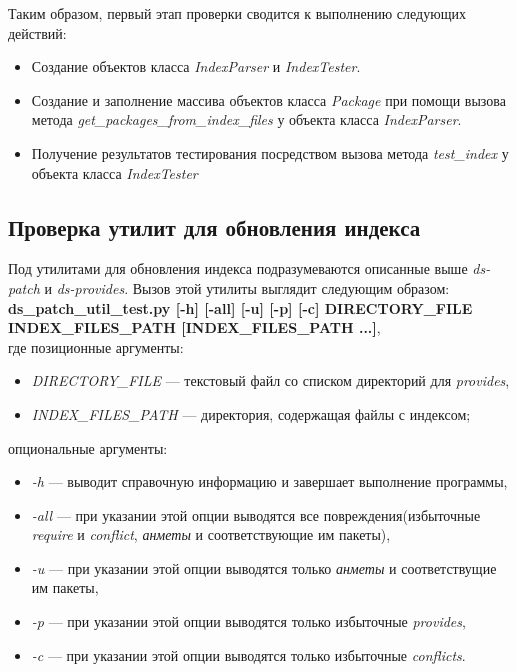 Таким образом, первый этап проверки сводится к выполнению следующих действий:
\begin{itemize}
\item{Создание объектов класса \textit{IndexParser} и \textit{IndexTester}.}
\item{Создание и заполнение массива объектов класса \textit{Package} при помощи
вызова метода \textit{get\_packages\_from\_index\_files} у объекта класса \textit{IndexParser}.}
\item{Получение результатов тестирования посредством вызова метода \textit{test\_index}
у объекта класса \textit{IndexTester}}
\end{itemize}



\subsection{Проверка утилит для обновления индекса}
Под утилитами для обновления индекса подразумеваются описанные
выше \textit{ds-patch} и \textit{ds-provides}.
Вызов этой утилиты выглядит следующим образом:\\
\textbf{ds\_patch\_util\_test.py [-h] [-all] [-u] [-p] [-c] DIRECTORY\_FILE INDEX\_FILES\_PATH [INDEX\_FILES\_PATH ...]},\\
 где
позиционные аргументы:\\
\begin{itemize}
\item{\emph{DIRECTORY\_FILE} --- текстовый файл со списком директорий для \textit{provides},}
\item{\emph{INDEX\_FILES\_PATH} --- директория, содержащая файлы с индексом;}
\end{itemize}
опциональные аргументы:\\
\begin{itemize}
\item{\emph{-h} --- выводит справочную информацию и завершает выполнение программы,}
\item{\emph{-all} --- при указании этой опции выводятся все повреждения(избыточные \textit{require} и \textit{conflict}, \textit{анметы} и
соответствующие им пакеты),}
\item{\emph{-u} --- при указании этой опции выводятся только \textit{анметы} и соответствущие им пакеты,}
\item{\emph{-p} --- при указании этой опции выводятся только  избыточные \textit{provides},}
\item{\emph{-c} --- при указании этой опции выводятся только избыточные \textit{conflicts}.}
\end{itemize}

